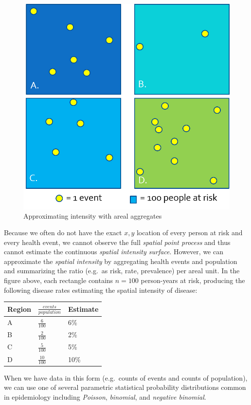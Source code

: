 \documentclass[
]{book}
\begin{document}
\begin{figure}
\centering
\includegraphics{images/point-process-2.png}
\caption{\label{fig:unnamed-chunk-67}Approximating intensity with areal aggregates}
\end{figure}

Because we often do not have the exact \(x,y\) location of every person at risk and every health event, we cannot observe the full \emph{spatial point process} and thus cannot estimate the continuous \emph{spatial intensity surface}. However, we can approximate the \emph{spatial intensity} by aggregating health events and population and summarizing the ratio (e.g.~as risk, rate, prevalence) per areal unit. In the figure above, each rectangle contains \(n=100\) person-years at risk, producing the following disease rates estimating the spatial intensity of disease:

\begin{longtable}[]{@{}lll@{}}
\toprule
Region & \(\frac{events}{population}\) & Estimate\tabularnewline
\midrule
\endhead
A & \(\frac{6}{100}\) & 6\%\tabularnewline
B & \(\frac{2}{100}\) & 2\%\tabularnewline
C & \(\frac{5}{100}\) & 5\%\tabularnewline
D & \(\frac{10}{100}\) & 10\%\tabularnewline
\bottomrule
\end{longtable}

When we have data in this form (e.g.~counts of events and counts of population), we can use one of several parametric statistical probability distributions common in epidemiology including \emph{Poisson}, \emph{binomial}, and \emph{negative binomial}.
\end{document}

